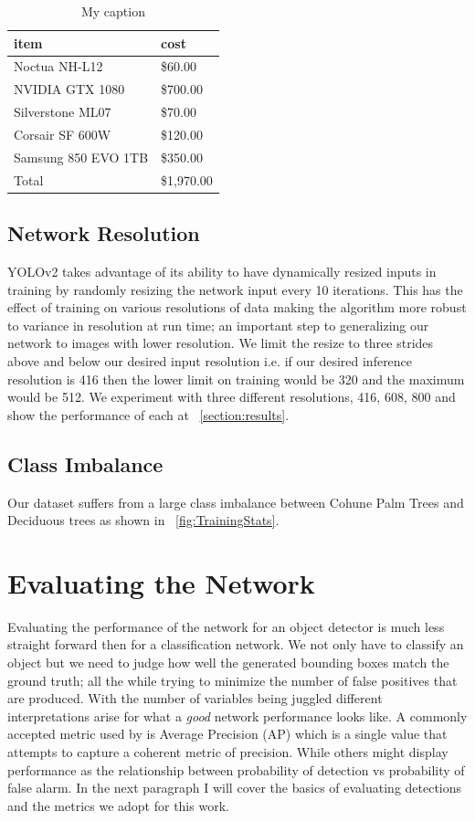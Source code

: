 \begin{table}[]
\centering
\caption{My caption}\label{table:DesktopBOM}
\begin{tabular}{ll}
item                & cost       \\ \hline
Noctua NH-L12       & \$60.00    \\
NVIDIA GTX 1080     & \$700.00   \\
Silverstone ML07    & \$70.00    \\
Corsair SF 600W     & \$120.00   \\
Samsung 850 EVO 1TB & \$350.00   \\ \hline
Total               & \$1,970.00 \\
\end{tabular}
\end{table}


\subsection{Network Resolution}

YOLOv2 takes advantage of its ability to have dynamically resized inputs in training by randomly resizing the network input every 10 iterations. This has the effect of training on various resolutions of data making the algorithm more robust to variance in resolution at run time; an important step to generalizing our network to images with lower resolution. We limit the resize to three strides above and below our desired input resolution i.e. if our desired inference resolution is 416 then the lower limit on training would be 320 and the maximum would be 512. We experiment with three different resolutions, 416, 608, 800 and show the performance of each at ~\ref{section:results}.

\subsection{Class Imbalance}\label{section:class_imbalance}

Our dataset suffers from a large class imbalance between Cohune Palm Trees and Deciduous trees as shown in ~\ref{fig:TrainingStats}.

\section{Evaluating the Network}

Evaluating the performance of the network for an object detector is much less straight forward then for a classification network. We not only have to classify an object but we need to judge how well the generated bounding boxes match the ground truth; all the while trying to minimize the number of false positives that are produced. With the number of variables being juggled different interpretations arise for what a \textit{good} network performance looks like. A commonly accepted metric used by \cite{COCO} is Average Precision (AP) which is a single value that attempts to capture a coherent metric of precision. While others might display performance as the relationship between probability of detection vs probability of false alarm. In the next paragraph I will cover the basics of evaluating detections and the metrics we adopt for this work.

